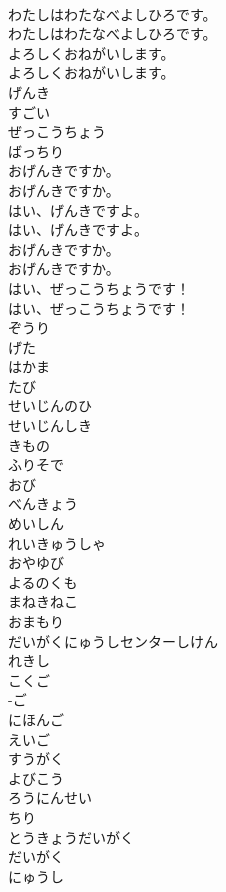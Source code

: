 \documentclass[8pt]{extreport}
\begin{document}
\begin{CJK}{UTF8}{min}
\\	わたしはわたなべよしひろです。	
\\	わたしはわたなべよしひろです。 
\\	よろしくおねがいします。	
\\	よろしくおねがいします。 
\\	げんき
\\	すごい
\\	ぜっこうちょう
\\	ばっちり
\\	おげんきですか。	
\\	おげんきですか。 
\\	はい、げんきですよ。	
\\	はい、げんきですよ。 
\\	おげんきですか。	
\\	おげんきですか。 
\\	はい、ぜっこうちょうです！	
\\	はい、ぜっこうちょうです！ 
\\	ぞうり
\\	げた
\\	はかま
\\	たび
\\	せいじんのひ
\\	せいじんしき
\\	きもの
\\	ふりそで
\\	おび
\\	べんきょう
\\	めいしん
\\	れいきゅうしゃ
\\	おやゆび
\\	よるのくも
\\	まねきねこ
\\	おまもり
\\	だいがくにゅうしセンターしけん
\\	れきし
\\	こくご
\\	-ご
\\	にほんご
\\	えいご
\\	すうがく
\\	よびこう
\\	ろうにんせい
\\	ちり
\\	とうきょうだいがく
\\	だいがく
\\	にゅうし

\end{CJK}
\end{document}

